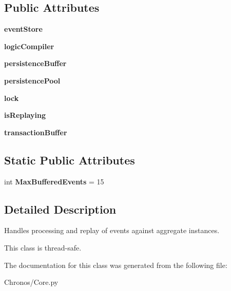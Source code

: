 \subsection*{Public Attributes}
\begin{DoxyCompactItemize}
\item 
{\bfseries event\+Store}
\item 
{\bfseries logic\+Compiler}
\item 
{\bfseries persistence\+Buffer}
\item 
{\bfseries persistence\+Pool}
\item 
{\bfseries lock}
\item 
{\bfseries is\+Replaying}
\item 
{\bfseries transaction\+Buffer}
\end{DoxyCompactItemize}
\subsection*{Static Public Attributes}
\begin{DoxyCompactItemize}
\item 
int {\bfseries Max\+Buffered\+Events} = 15
\end{DoxyCompactItemize}


\subsection{Detailed Description}
Handles processing and replay of events against aggregate instances. 

This class is thread-\/safe. 

The documentation for this class was generated from the following file\+:\begin{DoxyCompactItemize}
\item 
Chronos/Core.\+py\end{DoxyCompactItemize}

